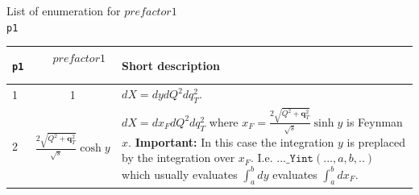 \documentclass[prd,nofootinbib,eqsecnum,final]{revtex4}
\renewcommand{\(}{\left(}
\renewcommand{\)}{\right)}
\renewcommand{\[}{\left[}
\renewcommand{\]}{\right]}
\renewcommand{\vec}[1]{\bm{#1}}
\begin{document}
\begin{center}
List of enumeration for $prefactor1$
\\
\texttt{p1}
\\
\begin{tabular}{||l|c||p{12cm}||}
\hline\hline
\texttt{p1} & ~~$prefactor1$~~&  Short description 
\\\hline
1 & 1 & $dX=dy dQ^2 dq_T^2$.
\\\hline
2 & $\frac{2\sqrt{Q^2+\vec q_T^2}}{\sqrt{s}}\cosh y$ & $dX=dx_F dQ^2 dq_T^2$ where $x_F=\frac{2\sqrt{Q^2+\vec q_T^2}}{\sqrt{s}}\sinh y$ is Feynman $x$. \textbf{Important:} In this case the integration $y$ is preplaced by the integration over $x_F$. I.e. $\texttt{...\_Yint}(..., a,b,..)$ which usually evaluates $\int_a^b dy$ evaluates $\int_a^bdx_F$.
\\\hline\hline
\end{tabular}
\end{center}
\end{document}
